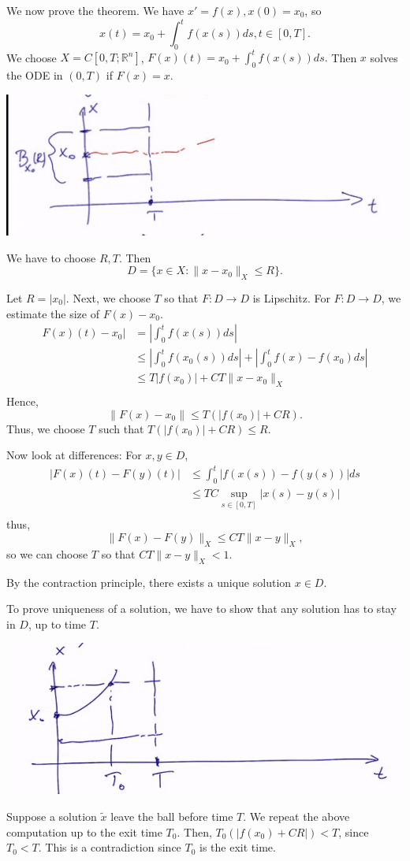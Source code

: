 \documentclass[11pt]{scrartcl}
\newcommand{\R}{\mathbb{R}}
\begin{document}
We now prove the theorem.  We have $x' = f(x), x(0) = x_0$, so 
$$x(t) = x_0 + \int_{0}^t f(x(s))ds, t \in [0, T].$$
We choose $X = C[0, T; \R^n]$, $F(x)(t) = x_0 + \int_{0}^t f(x(s))ds.$ Then $x$ solves the ODE in $(0, T)$ if $F(x) = x$.
\begin{center}
\includegraphics[scale=0.5]{ball.png}
\end{center}
We have to choose $R, T$.  Then
$$D = \{x \in X : \|x - x_0 \|_X \le R\}.$$

Let $R = |x_0|$.  Next, we choose $T$ so that $F : D \rightarrow D$ is Lipschitz.  For $F: D \rightarrow D$, we estimate the size of $F(x) - x_0$.
\begin{align*}
F(x)(t) - x_0| &= \left |\int_0^t f(x(s))ds\right | \\
&\le \left |\int_0^t f(x_0(s))ds\right | + \left | \int_0^t f(x) - f(x_0) ds \right | \\
&\le T |f(x_0)| + CT\|x - x_0\|_X  \\
\end{align*}
Hence,
$$\|F(x) - x_0\| \le T(|f(x_0)| + CR).$$
Thus, we choose $T$ such that $T(|f(x_0)| + CR) \le R$.

Now look at differences: For $x, y \in D$,
\begin{align*}
|F(x)(t) - F(y)(t)| &\le \int_{0}^t |f(x(s)) - f(y(s))| ds\\
&\le T C\sup_{s \in [0, T]} |x(s) - y(s)| \\
\end{align*}
thus,
$$\|F(x) - F(y)\|_X \le CT \|x - y\|_X,$$
so we can choose $T$ so that $CT\|x-y \|_X < 1$.

By the contraction principle, there exists a unique solution $x \in D$.  

To prove uniqueness of a solution, we have to show that any solution has to stay in $D$, up to time $T$.

\begin{center}
\includegraphics[scale=0.5]{unique.png}
\end{center}
Suppose a solution $\tilde{x}$ leave the ball before time $T$.  We repeat the above computation up to the exit time $T_0$.  Then, $T_0(|f(x_0) + CR|) < T$, since $T_0 < T$.  This is a contradiction since $T_0$ is the exit time.
\end{document}
